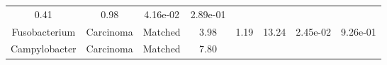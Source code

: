 \documentclass[12pt,]{article}
\begin{document}
\begin{longtable}[]{@{}cccccccc@{}}
\begin{minipage}[t]{0.13\columnwidth}
0.41\strut
\end{minipage} & \begin{minipage}[t]{0.13\columnwidth}\centering\strut
0.98\strut
\end{minipage} & \begin{minipage}[t]{0.07\columnwidth}\centering\strut
4.16e-02\strut
\end{minipage} & \begin{minipage}[t]{0.07\columnwidth}\centering\strut
2.89e-01\strut
\end{minipage}\tabularnewline
\begin{minipage}[t]{0.16\columnwidth}\centering\strut
Fusobacterium\strut
\end{minipage} & \begin{minipage}[t]{0.08\columnwidth}\centering\strut
Carcinoma\strut
\end{minipage} & \begin{minipage}[t]{0.09\columnwidth}\centering\strut
Matched\strut
\end{minipage} & \begin{minipage}[t]{0.05\columnwidth}\centering\strut
3.98\strut
\end{minipage} & \begin{minipage}[t]{0.13\columnwidth}\centering\strut
1.19\strut
\end{minipage} & \begin{minipage}[t]{0.13\columnwidth}\centering\strut
13.24\strut
\end{minipage} & \begin{minipage}[t]{0.07\columnwidth}\centering\strut
2.45e-02\strut
\end{minipage} & \begin{minipage}[t]{0.07\columnwidth}\centering\strut
9.26e-01\strut
\end{minipage}\tabularnewline
\begin{minipage}[t]{0.16\columnwidth}\centering\strut
Campylobacter\strut
\end{minipage} & \begin{minipage}[t]{0.08\columnwidth}\centering\strut
Carcinoma\strut
\end{minipage} & \begin{minipage}[t]{0.09\columnwidth}\centering\strut
Matched\strut
\end{minipage} & \begin{minipage}[t]{0.05\columnwidth}\centering\strut
7.80\strut
\end{minipage} & \begin{minipage}[t]{0.13\columnwidth}\centering\strut

\end{minipage}
\end{longtable}
\end{document}
